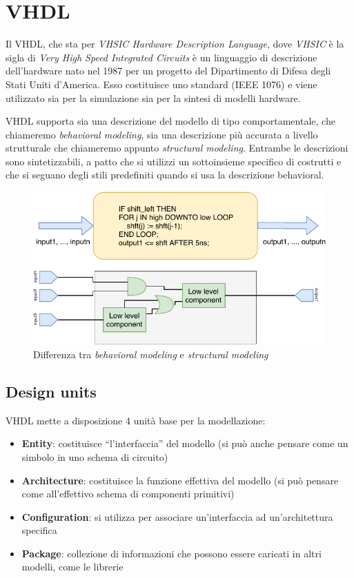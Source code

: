 \documentclass[10pt,a4paper,oneside]{scrbook}
\begin{document}

\chapter{VHDL}
Il VHDL, che sta per \textit{VHSIC Hardware Description Language}, dove \textit{VHSIC} è la sigla di \textit{Very High Speed Integrated Circuits} 
è un linguaggio di descrizione dell'hardware nato nel 1987 per un progetto del Dipartimento di Difesa degli Stati Uniti d'America.
Esso costituisce uno standard (IEEE 1076) e viene utilizzato sia per la simulazione sia per la sintesi di modelli hardware.

VHDL supporta sia una descrizione del modello di tipo comportamentale, che chiameremo \textit{behavioral modeling}, sia una descrizione più accurata
a livello strutturale che chiameremo appunto \textit{structural modeling}. Entrambe le descrizioni sono sintetizzabili, a patto che si utilizzi un
sottoinsieme specifico di costrutti e che si seguano degli stili predefiniti quando si usa la descrizione behavioral.
\begin{figure}[h]
    \centering
    \includegraphics[width=1\linewidth]{"img/vhdl modeling"}
    \caption{Differenza tra \textit{behavioral modeling} e \textit{structural modeling}}
    \label{fig:vhdl_modeling}
\end{figure}

\section{Design units}
VHDL mette a disposizione 4 unità base per la modellazione:
\begin{itemize}
    \item \textbf{Entity}: costituisce ``l'interfaccia'' del modello (si può 
    anche pensare come un simbolo in uno schema di circuito)
    \item \textbf{Architecture}: costituisce la funzione effettiva del modello 
    (si può pensare come all'effettivo schema di componenti primitivi)
    \item \textbf{Configuration}: si utilizza per associare un'interfaccia ad un'architettura specifica
    \item \textbf{Package}: collezione di informazioni che possono essere caricati in altri modelli, come le librerie
\end{itemize}
\end{document}
